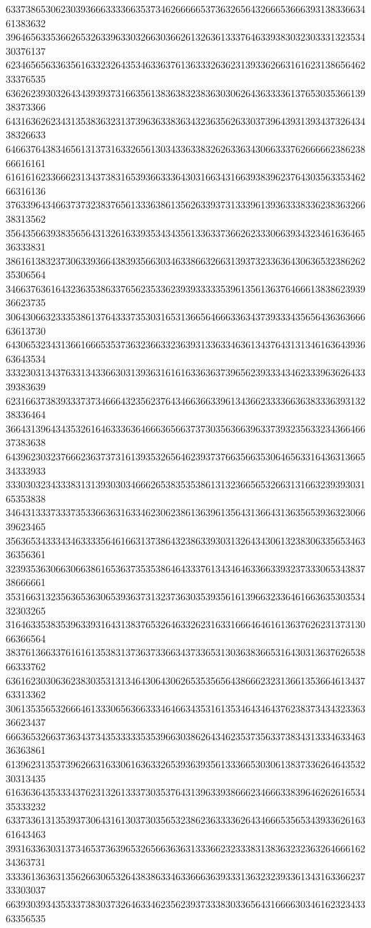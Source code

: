 63373865306230393666333366353734626666653736326564326665366639313833663461383632
39646563353662653263396330326630366261326361333764633938303230333132353430376137
62346565633635616332326435346336376136333263623139336266316162313865646233376535
63626239303264343939373166356138363832383630306264363333613765303536613938373366
64316362623431353836323137396363383634323635626330373964393139343732643438326633
64663764383465613137316332656130343363383262633634306633376266666238623866616161
61616162336662313437383165393663336430316634316639383962376430356335346266316136
37633964346637373238376561333638613562633937313339613936333833623836326638313562
35643566393835656431326163393534343561336337366262333066393432346163646536333831
38616138323730633936643839356630346338663266313937323363643063653238626235306564
34663763616432363538633765623533623939333335396135613637646661383862393936623735
30643066323335386137643337353031653136656466633634373933343565643636366663613730
64306532343136616665353736323663323639313363346361343764313134616364393663643534
33323031343763313433663031393631616163363637396562393334346233396362643339383639
62316637383933373734666432356237643466366339613436623333663638333639313238336464
36643139643435326164633363646663656637373035636639633739323563323436646637383638
64396230323766623637373161393532656462393737663566353064656331643631366534333933
33303032343338313139303034666265383535386131323665653266313166323939303165353838
34643133373337353366363163346230623861363961356431366431363565393632306639623465
35636534333434633335646166313738643238633930313264343061323830633565346336356361
32393536306630663861653637353538646433376134346463366339323733306534383738666661
35316631323563653630653936373132373630353935616139663233646166363530353432303265
31646335383539633931643138376532646332623163316664646161363762623137313066366564
38376136633761616135383137363733663437336531303638366531643031363762653866333762
63616230306362383035313134643064306265353565643866623231366135366461343763313362
30613535653266646133306563663334646634353161353464346437623837343432336336623437
66636532663736343734353333353539663038626434623537356337383431333463346336363861
61396231353739626631633061636332653936393561333665303061383733626464353230313435
61636364353334376231326133373035376431396339386662346663383964626261653435333232
63373361313539373064316130373035653238623633336264346665356534393362616361643463
39316336303137346537363965326566363631333662323338313836323236326466616234363731
33336136363135626630653264383863346336663639333136323239336134316336623733303037
66393039343533373830373264633462356239373338303365643166663034616232343363356535

